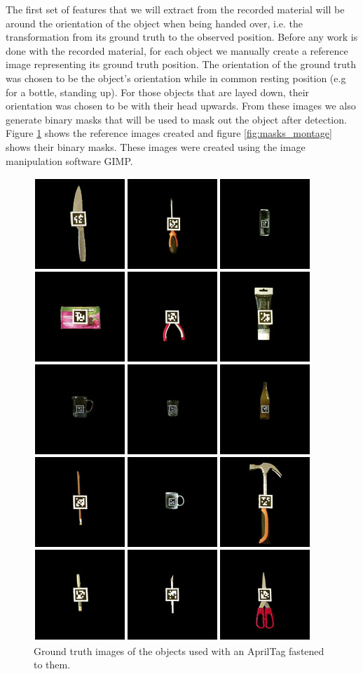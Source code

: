 The first set of features that we will extract from the recorded material will be around the orientation of the object when being handed over, i.e. the transformation from its ground truth to the observed position. Before any work is done with the recorded material, for each object we manually create a reference image representing its ground truth position. The orientation of the ground truth was chosen to be the object's orientation while in common resting position (e.g for a bottle, standing up). For those objects that are layed down, their orientation was chosen to be with their head upwards. From these images we also generate binary masks that will be used to mask out the object after detection. Figure \ref{fig:objects_montage} shows the reference images created and figure \ref{fig:masks_montage} shows their binary masks. These images were created using the image manipulation software GIMP.

\begin{figure}
	\centering
	\includegraphics[width=\textwidth]{img/methods/objects.jpg}
	\caption{Ground truth images of the objects used with an AprilTag fastened to them.}
	\label{fig:objects_montage}
\end{figure}

